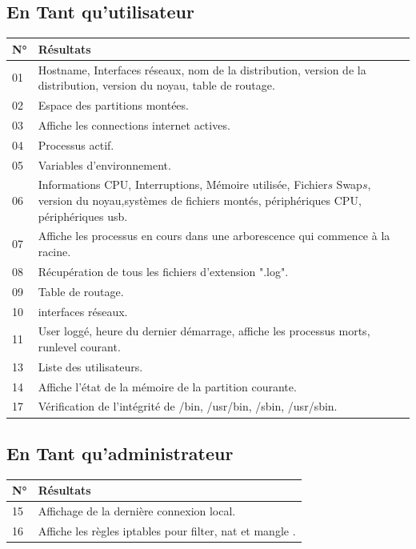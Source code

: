 \documentclass[11pt,a4paper,titlepage, oneside]{article}
\begin{document}
	\subsection{{\color{blue}En Tant qu'utilisateur}}
		\begin{tabular}{|l|p{12cm}|}
			\hline
				\textbf{N°}&\textbf{Résultats}\\
			\hline
				01 & Hostname, Interfaces réseaux, nom de la distribution, version de la distribution, version du noyau, table de routage.\\
			\hline
				02 & Espace des partitions montées.\\
			\hline
				03 & Affiche les connections internet actives.\\
			\hline
				04 & Processus actif.\\
			\hline
				05 & Variables d'environnement.\\
			\hline
				06 & Informations CPU, Interruptions, Mémoire utilisée, Fichier\(s\) Swap\(s\), version du noyau,systèmes de fichiers montés, périphériques CPU, périphériques usb.\\
			\hline
				07 & Affiche les processus en cours dans une arborescence qui commence à la racine.\\
			\hline
				08 & Récupération de tous les fichiers d'extension ".log".\\
			\hline
				09 & Table de routage.\\
			\hline
				10 & interfaces réseaux.\\
			\hline
				11 & User loggé, heure du dernier démarrage, affiche les processus morts, runlevel courant.\\
			\hline
				13 & Liste des utilisateurs.\\
			\hline
				14 & Affiche l'état de la mémoire de la partition courante.\\
			\hline
				17 & Vérification de l'intégrité de /bin, /usr/bin, /sbin, /usr/sbin.\\
			\hline
		\end{tabular}
			
	\subsection{{\color{blue}En Tant qu'administrateur}}
		\begin{tabular}{|l|p{12cm}|}
			\hline
			\textbf{N°}&\textbf{Résultats}\\
			\hline
				15 & Affichage de la dernière connexion local.\\
			\hline
				16 & Affiche les règles iptables pour filter, nat et mangle .\\
			\hline
		\end{tabular}
		
\end{document}
